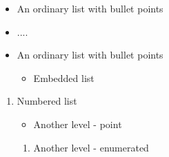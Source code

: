 \documentclass[a4paper, 11pt, oneside,table]{Thesis}
\begin{document}
\normalsize
\begin{itemize}
	\item An ordinary list with bullet points
	\item ....
\end{itemize}

\vspace{1cm}

\begin{itemize}
	\item An ordinary list with bullet points
	\begin{itemize}
		\item Embedded list
	\end{itemize}
\end{itemize}

\vspace{1cm}

\begin{enumerate}
	\item Numbered list
	\begin{itemize}
		\item Another level - point
	\end{itemize}
	\begin{enumerate}
		\item Another level - enumerated
	\end{enumerate}
\end{enumerate}
\end{document}
